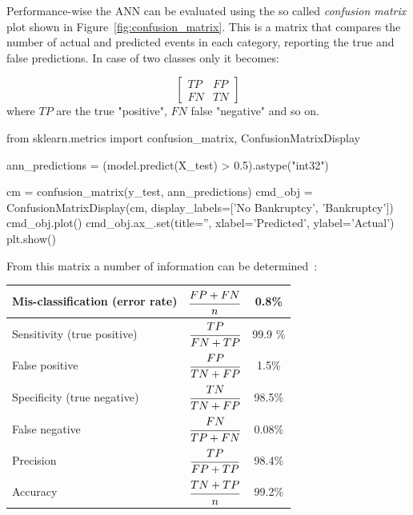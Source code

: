 Performance-wise the ANN can be evaluated using the so called \emph{confusion matrix} plot shown in Figure~\ref{fig:confusion_matrix}. This is a matrix that compares the number of actual and predicted events in each category, reporting the true and false predictions. In case of two classes only it becomes:

\begin{equation*}
	\begin{bmatrix}
		TP & FP \\
		FN & TN  
	\end{bmatrix}
\end{equation*}
\noindent
where $TP$ are the true "positive", $FN$ false "negative" and so on.

\begin{ipython}
from sklearn.metrics import confusion_matrix, ConfusionMatrixDisplay
	
ann_predictions = (model.predict(X_test) > 0.5).astype("int32")
	
cm = confusion_matrix(y_test, ann_predictions)
cmd_obj = ConfusionMatrixDisplay(cm, display_labels=['No Bankruptcy', 'Bankruptcy'])
cmd_obj.plot()
cmd_obj.ax_.set(title='', xlabel='Predicted', ylabel='Actual')
plt.show()
\end{ipython}
\noindent
From this matrix a number of information can be determined~\cite{bib:sensitivity}:

\makegapedcells\begin{table}[htbp]
\centering
\begin{tabular}{|l|c|c|}
\hline
Mis-classification (error rate) & $\cfrac{FP+FN}{n}$ & 0.8\% \\
\hline
Sensitivity (true positive) & $\cfrac{TP}{FN+TP}$ & 99.9 \% \\
\hline
False positive & $\cfrac{FP}{TN+FP}$ & 1.5\% \\
\hline
Specificity (true negative) & $\cfrac{TN}{TN+FP}$ &  98.5\% \\
\hline
False negative & $\cfrac{FN}{TP+FN}$ & 0.08\% \\
\hline
Precision & $\cfrac{TP}{FP+TP}$ & 98.4\% \\ 
\hline
Accuracy & $\cfrac{TN+TP}{n}$ & 99.2\% \\
\hline
\end{tabular}
\end{table}

